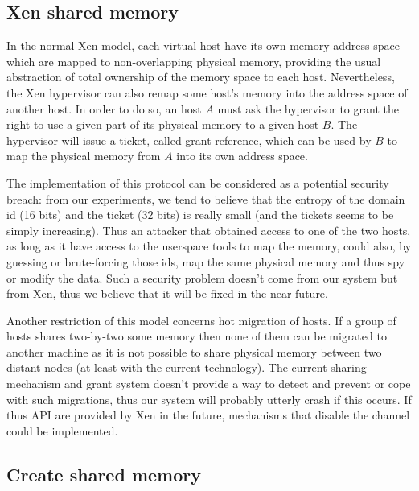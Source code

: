 \documentclass[journal]{IEEEtran}
\begin{document}
\subsection{Xen shared memory}
\label{xen_shared_memory}

In the normal Xen model, each virtual host have its own memory address space which are mapped to non-overlapping physical memory, providing the usual abstraction of total ownership of the memory space to each host. Nevertheless, the Xen hypervisor can also remap some host's memory into the address space of another host. In order to do so, an host $A$ must ask the hypervisor to grant the right to use a given part of its physical memory to a given host $B$. The hypervisor will issue a ticket, called grant reference, which can be used by $B$ to map the physical memory from $A$ into its own address space.

The implementation of this protocol can be considered as a potential security breach: from our experiments, we tend to believe that the entropy of the domain id (16 bits) and the ticket (32 bits) is really small (and the tickets seems to be simply increasing). Thus an attacker that obtained access to one of the two hosts, as long as it have access to the userspace tools to map the memory, could also, by guessing or brute-forcing those ids, map the same physical memory and thus spy or modify the data. Such a security problem doesn't come from our system but from Xen, thus we believe that it will be fixed in the near future.

Another restriction of this model concerns hot migration of hosts. If a group of hosts shares two-by-two some memory then none of them can be migrated to another machine as it is not possible to share physical memory between two distant nodes (at least with the current technology). The current sharing mechanism and grant system doesn't provide a way to detect and prevent or cope with such migrations, thus our system will probably utterly crash if this occurs. If thus API are provided by Xen in the future, mechanisms that disable the channel could be implemented.

\subsection{Create shared memory}
\end{document}
